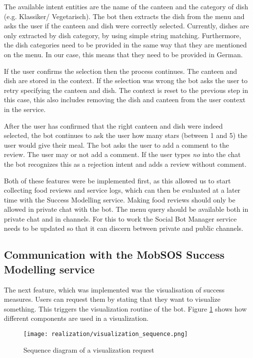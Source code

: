 The available intent entities are the name of the canteen and the category of dish (e.g. Klassiker/ Vegetarisch).
The bot then extracts the dish from the menu and asks the user if the canteen and dish were correctly selected. 
Currently, dishes are only extracted by dish category, by using simple string matching. Furthermore, the dish categories need to be provided in the same way that they are mentioned on the menu. In our case, this means that they need to be provided in German.

If the user confirms the selection then the process continues. 
The canteen and dish are stored in the context. 
If the selection was wrong the bot asks the user to retry specifying the canteen and dish. 
The context is reset to the previous step in this case, this also includes removing the dish and canteen from the user context in the service.

After the user has confirmed that the right canteen and dish were indeed selected, the bot continues to ask the user how many stars (between 1 and 5) the user would give their meal. 
The bot asks the user to add a comment to the review. The user may or not add a comment. If the user types \emph{no} into the chat the bot recognizes this as a rejection intent and adds a review without comment.

Both of these features were be implemented first, as this allowed us to start collecting food reviews and service logs, which can then be evaluated at a later time with the Success Modelling service.
Making food reviews should only be allowed in private chat with the bot. 
The menu query should be available both in private chat and in channels.
For this to work the Social Bot Manager service needs to be updated so that it can discern between private and public channels.

\subsection{Communication with the MobSOS Success Modelling service}

The next feature, which was implemented was the visualisation of success measures. Users can request them by stating that they want to visualize something.
This triggers the visualization routine of the bot. Figure \ref{fig:visualReqSeq} shows how different components are used in a visualization.
\begin{figure}[h]
    \centering
    \texttt{[image: realization/visualization\_sequence.png]}
    \caption{Sequence diagram of a visualization request}
    \label{fig:visualReqSeq}
\end{figure}

